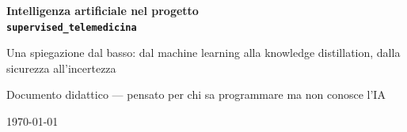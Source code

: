 \documentclass[11pt,a4paper]{report}
\begin{document}
\begin{titlepage}
  \centering
  \vspace*{2cm}
  {\Huge\bfseries Intelligenza artificiale nel progetto\\[0.4em] \texttt{supervised\_telemedicina}\par}
  \vspace{1.2cm}
  {\Large Una spiegazione dal basso: dal machine learning alla knowledge
  distillation, dalla sicurezza all'incertezza\par}
  \vspace{2.5cm}
  {\large Documento didattico --- pensato per chi sa programmare ma non conosce l'IA\par}
  \vfill
  {\large \today\par}
  \vspace{1cm}
\end{titlepage}

\tableofcontents
\clearpage















\end{document}
